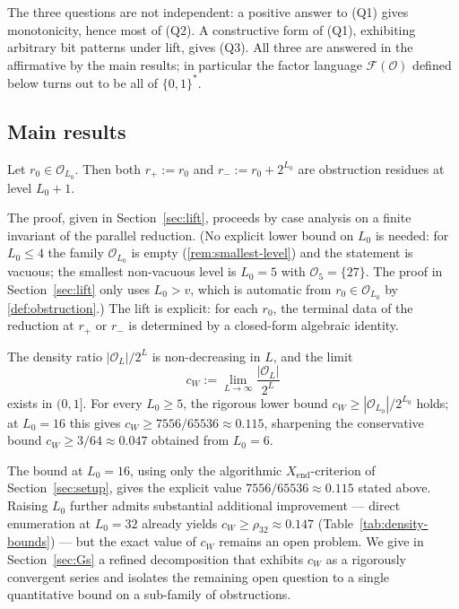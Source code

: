 \documentclass[11pt,reqno]{amsart}
\newcommand{\Obs}{\mathcal{O}}
\newcommand{\Fac}{\mathcal{F}}
\newcommand{\Xend}{X_{\mathrm{end}}}
\begin{document}
The three questions are not independent: a positive answer to (Q1) gives
monotonicity, hence most of (Q2). A constructive form of (Q1), exhibiting
arbitrary bit patterns under lift, gives (Q3). All three are answered in
the affirmative by the main results; in particular the factor language
$\Fac(\Obs)$ defined below turns out to be all of $\{0,1\}^*$.

\subsection{Main results}\label{sec:main-results}

\begin{theorem}
\label{thm:lift-intro}
Let $r_0 \in \Obs_{L_0}$. Then both $r_+ := r_0$ and
$r_- := r_0 + 2^{L_0}$ are obstruction residues at level $L_0 + 1$.
\end{theorem}

The proof, given in Section~\ref{sec:lift}, proceeds by case analysis on a
finite invariant of the parallel reduction. (No explicit lower bound on
$L_0$ is needed: for $L_0 \le 4$ the family $\Obs_{L_0}$ is empty
(\cref{rem:smallest-level}) and the statement is vacuous; the
smallest non-vacuous level is $L_0 = 5$ with $\Obs_5 = \{27\}$. The
proof in Section~\ref{sec:lift} only uses $L_0 > v$, which is automatic
from $r_0 \in \Obs_{L_0}$ by \cref{def:obstruction}.) The lift is explicit: for each $r_0$,
the terminal data of the reduction at $r_+$ or $r_-$ is determined by a
closed-form algebraic identity.

\begin{theorem}
\label{thm:density-intro}
The density ratio $|\Obs_L|/2^L$ is non-decreasing in $L$, and the limit
\[
c_W := \lim_{L \to \infty} \frac{|\Obs_L|}{2^L}
\]
exists in $(0, 1]$. For every $L_0 \ge 5$, the rigorous lower bound
$c_W \ge |\Obs_{L_0}|/2^{L_0}$ holds; at $L_0 = 16$ this gives
$c_W \ge 7556/65536 \approx 0.115$, sharpening the conservative
bound $c_W \ge 3/64 \approx 0.047$ obtained from $L_0 = 6$.
\end{theorem}

The bound at $L_0 = 16$, using only the algorithmic
$\Xend$-criterion of Section~\ref{sec:setup}, gives the explicit value
$7556/65536 \approx 0.115$ stated above. Raising $L_0$ further admits
substantial additional improvement --- direct enumeration at $L_0 = 32$
already yields $c_W \ge \rho_{32} \approx 0.147$
(Table~\ref{tab:density-bounds}) --- but the exact value of $c_W$ remains
an open problem. We give in
Section~\ref{sec:Gs} a refined decomposition that exhibits $c_W$ as a
rigorously convergent series and isolates the remaining open question to a
single quantitative bound on a sub-family of obstructions.
\end{document}

